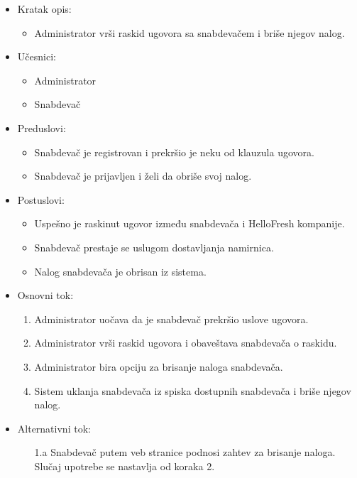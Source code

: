 
\begin{itemize}
    \item Kratak opis:
        \begin{itemize}
            \item Administrator vrši raskid ugovora sa snabdevačem i briše njegov nalog.
        \end{itemize}
    \item Učesnici:
        \begin{itemize}
            \item Administrator
            \item Snabdevač
        \end{itemize}
    \item Preduslovi:
        \begin{itemize}
            \item Snabdevač je registrovan i prekršio je neku od klauzula ugovora.
            \item Snabdevač je prijavljen i želi da obriše svoj nalog.
            
            
        \end{itemize}
    \item Postuslovi:
        \begin{itemize}
            \item Uspešno je raskinut ugovor između snabdevača i HelloFresh kompanije.
            \item Snabdevač prestaje se uslugom dostavljanja namirnica.
            \item Nalog snabdevača je obrisan iz sistema.
        \end{itemize}
    \item Osnovni tok:
         \begin{enumerate}
            \item Administrator uočava da je snabdevač prekršio uslove ugovora.
            \item Administrator vrši raskid ugovora i obaveštava snabdevača o raskidu.
            \item Administrator bira opciju za brisanje naloga snabdevača.
            \item Sistem uklanja snabdevača iz spiska dostupnih snabdevača i briše njegov nalog.
        \end{enumerate}
    \item Alternativni tok:
        \begin{itemize}
            \item[1.a] Snabdevač putem veb stranice podnosi zahtev za brisanje naloga. Slučaj upotrebe se nastavlja od koraka 2.
        \end{itemize}
\end{itemize}

